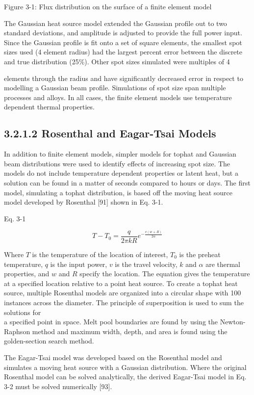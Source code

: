 \documentclass[10pt]{article}
\begin{document}
Figure 3-1: Flux distribution on the surface of a finite element model

The Gaussian heat source model extended the Gaussian profile out to two standard deviations, and amplitude is adjusted to provide the full power input. Since the Gaussian profile is fit onto a set of square elements, the smallest spot sizes used (4 element radius) had the largest percent error between the discrete and true distribution (25\%). Other spot sizes simulated were multiples of 4

elements through the radius and have significantly decreased error in respect to modelling a Gaussian beam profile. Simulations of spot size span multiple processes and alloys. In all cases, the finite element models use temperature dependent thermal properties.

\subsection*{3.2.1.2 Rosenthal and Eagar-Tsai Models}
In addition to finite element models, simpler models for tophat and Gaussian beam distributions were used to identify effects of increasing spot size. The models do not include temperature dependent properties or latent heat, but a solution can be found in a matter of seconds compared to hours or days. The first model, simulating a tophat distribution, is based off the moving heat source model developed by Rosenthal [91] shown in Eq. 3-1.

Eq. 3-1

$$
T-T_{0}=\frac{q}{2 \pi k R} e^{-\frac{v(w+R)}{2 \alpha}}
$$

Where $T$ is the temperature of the location of interest, $T_{0}$ is the preheat temperature, $q$ is the input power, $v$ is the travel velocity, $k$ and $\alpha$ are thermal properties, and $w$ and $R$ specify the location. The equation gives the temperature at a specified location relative to a point heat source. To create a tophat heat source, multiple Rosenthal models are organized into a circular shape with 100 instances across the diameter. The principle of superposition is used to sum the solutions for\\
a specified point in space. Melt pool boundaries are found by using the Newton-Raphson method and maximum width, depth, and area is found using the golden-section search method.

The Eagar-Tsai model was developed based on the Rosenthal model and simulates a moving heat source with a Gaussian distribution. Where the original Rosenthal model can be solved analytically, the derived Eagar-Tsai model in Eq. 3-2 must be solved numerically [93].
\end{document}
